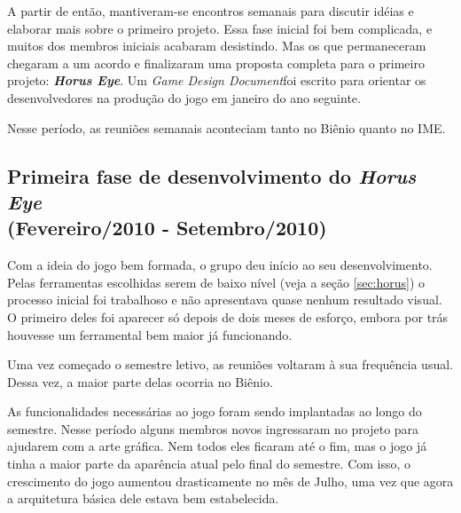 \documentclass[12pt,onecolumn,a4paper]{article}
\begin{document}
        A partir de então, mantiveram-se encontros semanais para discutir idéias e elaborar mais
        sobre o primeiro projeto. Essa fase inicial foi bem complicada, e muitos dos membros
        iniciais acabaram desistindo. Mas os que permaneceram chegaram a um acordo e finalizaram uma
        proposta completa para o primeiro projeto: \textit{\textbf{Horus Eye}}. Um \textit{Game
        Design Document}\footnotemark foi escrito para orientar os desenvolvedores na produção do
        jogo em janeiro do ano seguinte.
        
        Nesse período, as reuniões semanais aconteciam tanto no Biênio quanto no IME.
        

    \clearpage
    \subsection{Primeira fase de desenvolvimento do \textit{\textbf{Horus Eye}} \\
                {\small(Fevereiro/2010 - Setembro/2010)} }
        Com a ideia do jogo bem formada, o grupo deu início ao seu desenvolvimento. Pelas
        ferramentas escolhidas serem de baixo nível (veja a seção \ref{sec:horus}) o processo
        inicial foi trabalhoso e não apresentava quase nenhum resultado visual. O primeiro deles foi
        aparecer só depois de dois meses de esforço, embora por trás houvesse um ferramental bem
        maior já funcionando.
        
        Uma vez começado o semestre letivo, as reuniões voltaram à sua frequência usual. Dessa vez,
        a maior parte delas ocorria no Biênio.
        
        As funcionalidades necessárias ao jogo foram sendo implantadas ao longo do semestre. Nesse
        período alguns membros novos ingressaram no projeto para ajudarem com a arte gráfica. Nem
        todos eles ficaram até o fim, mas o jogo já tinha a maior parte da aparência atual pelo
        final do semestre. Com isso, o crescimento do jogo aumentou drasticamente no mês de Julho,
        uma vez que agora a arquitetura básica dele estava bem estabelecida.
        
\end{document}

